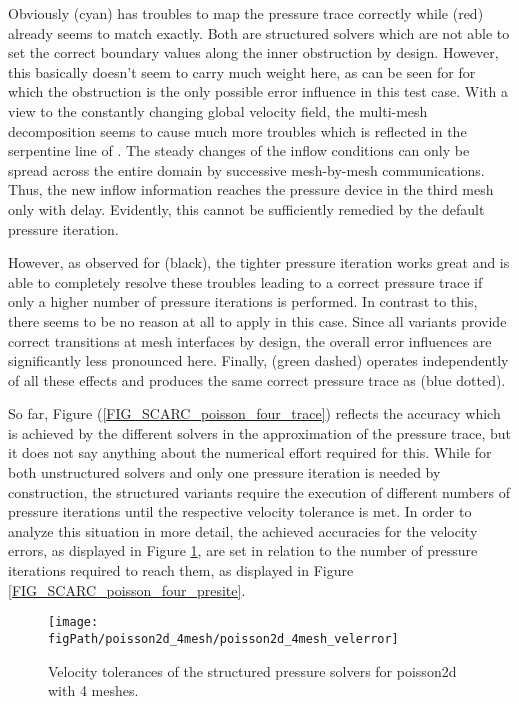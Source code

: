 Obviously \fftdefault{} (cyan) has troubles to map the pressure trace correctly while \scarcdefault{} (red) 
already seems to match exactly. Both are structured solvers which are not able to set the correct boundary values along the inner obstruction by design. However, this basically doesn't seem to carry much weight here, as can be seen for \scarcdefault{} for which the obstruction is the only possible error influence in this test case.
With a view to the constantly changing global velocity field, the multi-mesh decomposition seems to cause much more troubles 
which is reflected in the serpentine line of \fftdefault{}. The steady changes of the inflow conditions can only be spread across the entire domain by successive mesh-by-mesh communications. Thus, the new inflow information reaches the pressure device in the third mesh only with delay. Evidently, this cannot be sufficiently remedied by the default pressure iteration.

However, as observed for \ffttight{} (black), the tighter pressure iteration works great and is able to completely resolve these troubles leading to a correct pressure trace if only a higher number of pressure iterations is performed.
In contrast to this, there seems to be no reason at all to apply \scarctight{} in this case. Since all \scarc{} variants provide correct transitions at mesh interfaces by design, the overall error influences are significantly less pronounced here.
Finally, \uscarc{} (green dashed) operates independently of all these effects and produces the same correct pressure trace as \uglmat{} (blue dotted).

So far, Figure (\ref{FIG_SCARC_poisson_four_trace}) reflects the accuracy which is achieved by the different solvers in the approximation of the pressure trace, but it does not say anything about the numerical effort required for this.
While for both unstructured solvers \uglmat{} and \uscarc{} only one pressure iteration is needed by construction, the structured variants require the execution of different numbers of pressure iterations until the respective velocity tolerance is met. 
In order to analyze this situation in more detail,  
the achieved accuracies for the velocity errors, as displayed in Figure \ref{FIG_SCARC_poisson_four_velerror}, are set in relation to
the number of pressure iterations required to reach them, as displayed in Figure \ref{FIG_SCARC_poisson_four_presite}.

\begin{figure}[ht]
\begin{center}
\texttt{[image: \\figPath/poisson2d\_4mesh/poisson2d\_4mesh\_velerror]}\\
\end{center}
\caption[Velocity tolerances of the structured pressure solvers in case of the 4-mesh poisson2d test case]{Velocity tolerances of the structured pressure solvers for {\ct poisson2d} with 4 meshes.}
\label{FIG_SCARC_poisson_four_velerror}
\end{figure}

